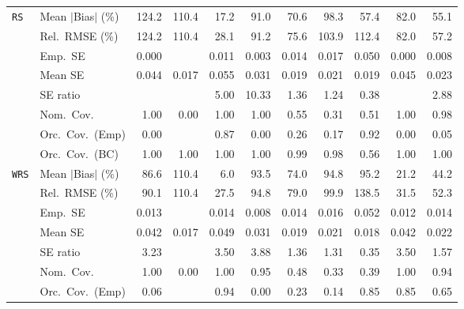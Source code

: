 \begin{landscape}
\begin{longtable}{llrrrrrrrrr}
\addlinespace[2pt]
\quad \texttt{RS} & Mean $|$Bias$|$ (\%) & 124.2 & 110.4 & \cellcolor{rankone}17.2 & 91.0 & 70.6 & 98.3 & \cellcolor{rankthree}57.4 & 82.0 & \cellcolor{ranktwo}55.1 \\
 & Rel.\ RMSE (\%) & 124.2 & 110.4 & \cellcolor{rankone}28.1 & 91.2 & \cellcolor{rankthree}75.6 & 103.9 & 112.4 & 82.0 & \cellcolor{ranktwo}57.2 \\
 & Emp.\ SE & 0.000 &  & 0.011 & 0.003 & 0.014 & 0.017 & 0.050 & 0.000 & 0.008 \\
 & Mean SE & 0.044 & 0.017 & 0.055 & 0.031 & 0.019 & 0.021 & 0.019 & 0.045 & 0.023 \\
 & SE ratio &  &  & 5.00 & 10.33 & \cellcolor{ranktwo}1.36 & \cellcolor{rankone}1.24 & \cellcolor{rankthree}0.38 &  & 2.88 \\
 & Nom.\ Cov. & \cellcolor{ranktwo}1.00 & 0.00 & \cellcolor{ranktwo}1.00 & \cellcolor{ranktwo}1.00 & \cellcolor{rankthree}0.55 & 0.31 & 0.51 & \cellcolor{ranktwo}1.00 & \cellcolor{rankone}0.98 \\
 & Orc.\ Cov.\ (Emp) & 0.00 &  & \cellcolor{ranktwo}0.87 & 0.00 & \cellcolor{rankthree}0.26 & 0.17 & \cellcolor{rankone}0.92 & 0.00 & 0.05 \\
 & Orc.\ Cov.\ (BC) & \cellcolor{rankthree}1.00 & \cellcolor{rankthree}1.00 & \cellcolor{rankthree}1.00 & \cellcolor{rankthree}1.00 & \cellcolor{ranktwo}0.99 & \cellcolor{rankone}0.98 & 0.56 & \cellcolor{rankthree}1.00 & \cellcolor{rankthree}1.00 \\
\addlinespace[2pt]
\quad \texttt{WRS} & Mean $|$Bias$|$ (\%) & 86.6 & 110.4 & \cellcolor{rankone}6.0 & 93.5 & 74.0 & 94.8 & 95.2 & \cellcolor{ranktwo}21.2 & \cellcolor{rankthree}44.2 \\
 & Rel.\ RMSE (\%) & 90.1 & 110.4 & \cellcolor{rankone}27.5 & 94.8 & 79.0 & 99.9 & 138.5 & \cellcolor{ranktwo}31.5 & \cellcolor{rankthree}52.3 \\
 & Emp.\ SE & 0.013 &  & 0.014 & 0.008 & 0.014 & 0.016 & 0.052 & 0.012 & 0.014 \\
 & Mean SE & 0.042 & 0.017 & 0.049 & 0.031 & 0.019 & 0.021 & 0.018 & 0.042 & 0.022 \\
 & SE ratio & 3.23 &  & 3.50 & 3.88 & \cellcolor{ranktwo}1.36 & \cellcolor{rankone}1.31 & 0.35 & 3.50 & \cellcolor{rankthree}1.57 \\
 & Nom.\ Cov. & \cellcolor{rankthree}1.00 & 0.00 & \cellcolor{rankthree}1.00 & \cellcolor{rankone}0.95 & 0.48 & 0.33 & 0.39 & \cellcolor{rankthree}1.00 & \cellcolor{ranktwo}0.94 \\
 & Orc.\ Cov.\ (Emp) & 0.06 &  & \cellcolor{rankone}0.94 & 0.00 & 0.23 & 0.14 & \cellcolor{ranktwo}0.85 & \cellcolor{ranktwo}0.85 & \cellcolor{rankthree}0.65 \\

\end{longtable}
\end{landscape}
